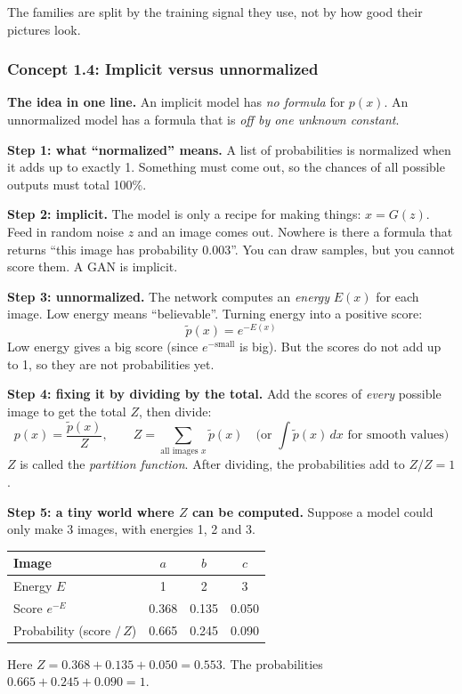 \documentclass[12pt,a4paper]{article}
\begin{document}
The families are split by the training signal they use, not by how good their pictures look.

\subsubsection{Concept 1.4: Implicit versus unnormalized}\label{c1-4}

\textbf{The idea in one line.} An implicit model has \emph{no formula} for $p(x)$. An unnormalized model has a formula that is \emph{off by one unknown constant}.

\textbf{Step 1: what ``normalized'' means.} A list of probabilities is normalized when it adds up to exactly 1. Something must come out, so the chances of all possible outputs must total 100\%.

\textbf{Step 2: implicit.} The model is only a recipe for making things: $x=G(z)$. Feed in random noise $z$ and an image comes out. Nowhere is there a formula that returns ``this image has probability 0.003''. You can draw samples, but you cannot score them. A GAN is implicit.

\textbf{Step 3: unnormalized.} The network computes an \emph{energy} $E(x)$ for each image. Low energy means ``believable''. Turning energy into a positive score:
\[
\tilde p(x)=e^{-E(x)}
\]
Low energy gives a big score (since $e^{-\text{small}}$ is big). But the scores do not add up to 1, so they are not probabilities yet.

\textbf{Step 4: fixing it by dividing by the total.} Add the scores of \emph{every} possible image to get the total $Z$, then divide:
\[
p(x)=\frac{\tilde p(x)}{Z},\qquad Z=\sum_{\text{all images }x}\tilde p(x)\quad\Big(\text{or }\int\tilde p(x)\,dx\text{ for smooth values}\Big)
\]
$Z$ is called the \emph{partition function}. After dividing, the probabilities add to $Z/Z=1$.

\textbf{Step 5: a tiny world where $Z$ can be computed.} Suppose a model could only make 3 images, with energies 1, 2 and 3.
\begin{center}
\begin{tabular}{@{}lccc@{}}
\toprule
Image & $a$ & $b$ & $c$ \\
\midrule
Energy $E$ & 1 & 2 & 3 \\
Score $e^{-E}$ & 0.368 & 0.135 & 0.050 \\
Probability (score $/\,Z$) & 0.665 & 0.245 & 0.090 \\
\bottomrule
\end{tabular}
\end{center}
Here $Z=0.368+0.135+0.050=0.553$. The probabilities $0.665+0.245+0.090=1$.
\end{document}
